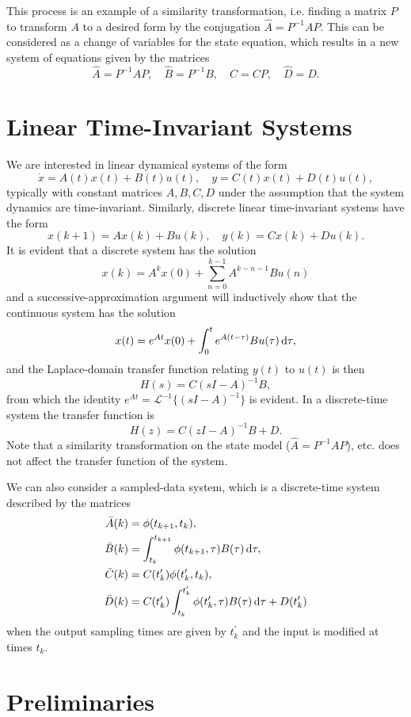 \documentclass{report}
\begin{document}
This process is an example of a similarity transformation,
i.e. finding a matrix $P$ to transform $A$ to a desired form by the
conjugation $\hat{A} = P^{-1} A P$. This can be considered as a change
of variables for the state equation, which results in a new system of
equations given by the matrices
$$
\hat{A} = P^{-1} A P, \quad
\hat{B} = P^{-1} B, \quad
\hat{C} = C P, \quad
\hat{D} = D.
$$

\section{Linear Time-Invariant Systems}
We are interested in linear dynamical systems of the form
$$
\dot{x} = A(t) x(t) + B(t) u(t), \quad
y = C(t) x(t) + D(t) u(t),
$$
typically with constant matrices $A, B, C, D$ under the assumption
that the system dynamics are time-invariant. Similarly, discrete
linear time-invariant systems have the form
$$
x(k+1) = A x(k) + B u(k), \quad
y(k) = C x(k) + D u(k).
$$
It is evident that a discrete system has the solution
$$
x(k) = A^k x(0) + \sum_{n=0}^{k-1} A^{k-n-1} B u(n)
$$
and a successive-approximation argument will inductively show that the
continuous system has the solution
$$
x(t) = e^{At} x(0) + \int_0^t e^{A(t - \tau)} B u(\tau) \dif \tau,
$$
and the Laplace-domain transfer function relating $y(t)$ to $u(t)$ is then
$$
H(s) = C(sI - A)^{-1} B,
$$
from which the identity $e^{At} = \mathcal{L}^{-1}\{(sI - A)^{-1}\}$
is evident. In a discrete-time system the transfer function is
$$
H(z) = C(zI - A)^{-1} B + D.
$$
Note that a similarity transformation on the state model
($\hat{A} = P^{-1} A P$), etc. does not affect the transfer function of
the system.

We can also consider a sampled-data system, which is a discrete-time
system described by the matrices
\begin{align*}
\bar{A}(k) &= \phi(t_{k+1}, t_k), \\
\bar{B}(k) &=
  \int_{t_k}^{t_{k+1}} \phi(t_{k+1}, \tau) B(\tau) \dif\tau, \\
\bar{C}(k) &= C(t_k^\prime)\phi(t_k^\prime, t_k), \\
\bar{D}(k) &=
  C(t_k^\prime)
  \int_{t_k}^{t_k^\prime} \phi(t_k^\prime, \tau) B(\tau) \dif \tau
+ D(t_k^\prime)
\end{align*}
when the output sampling times are given by $t_k^\prime$ and the input
is modified at times $t_k$.

\section{Preliminaries}
\end{document}
